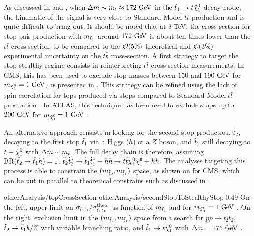     As discussed in  and
    , when $\Delta m \sim m_{t} \approx
    172~\text{GeV}$ in the $\tilde{t}_1 \rightarrow t \tilde{\chi}_1^0$ decay mode, the
    kinematic of the signal is very close to Standard Model $t\bar{t}$
    production and is quite difficult to bring out. It should be noted that at 8
    TeV, the cross-section for stop pair production with $m_{\tilde{t}_1}$ around
    $172~\text{GeV}$ is about ten times lower than the $t\bar{t}$ cross-section, to be
    compared to the $\mathcal{O}(5\%)$ theoretical and $\mathcal{O}(3\%)$ experimental
    uncertainty on the $t\bar{t}$ cross-section. A first strategy to target the
    stop stealthy regime consists in reinterpreting $t\bar{t}$ cross-section
    measurements. In CMS, this has been used to exclude stop masses between
    $150$ and $190~\text{GeV}$ for $m_{\tilde{\chi}_1^0} = 1~\text{GeV}$, as presented in
     \cite{topCrossSectionMeasurement}. This strategy
    can be refined using the lack of spin correlation for tops produced via
    stops compared to Standard Model $t\bar{t}$ production
    \cite{LightStopSigns}.  In ATLAS, this technique has been used to exclude
    stops up to $200~\text{GeV}$ for $m_{\tilde{\chi}_1^0} = 1~\text{GeV}$
    \cite{ATLASstealthyStops}.

    An alternative approach consists in looking for the second stop production,
    $\tilde{t}_2$, decaying to the first stop $\tilde{t}_1$ via a Higgs ($h$) or a
    $Z$ boson, and $\tilde{t}_1$ still decaying to $t + \tilde{\chi}_1^0$ with $\Delta m
    \sim m_{t}$. The full decay chain is therefore, assuming
    $\text{BR}(\tilde{t}_2 \rightarrow \tilde{t}_1 h) = 1$, $\tilde{t}_2
    \tilde{t}^*_2 \rightarrow \tilde{t}_1 \tilde{t}_1^* + hh \rightarrow t\bar{t}
    \tilde{\chi}_1^0 \tilde{\chi}_1^0 + hh$.  The analyses \cite{SUS-13-024,
    ATLASstopSearches} targeting this process is able to constrain the
    $(m_{\tilde{t}_2},m_{\tilde{t}_1})$ space, as shown on
     for CMS, which can be put in parallel to
    theoretical constrains such as discussed in
    .

                     {otherAnalysis/topCrossSection}
                     {otherAnalysis/secondStopToStealthyStop}
                     {0.49}
                     { On the left, upper limit on $\sigma_{\tilde{t}_1\tilde{t}_1} /
                     \sigma^\text{theo.}_{\tilde{t}_1\tilde{t}_1}$ as function of
                     $m_{\tilde{t}_1}$ and for $m_{\tilde{\chi}_1^0} = 1~\text{GeV}$
                     \cite{topCrossSectionMeasurement}. On the right, exclusion
                     limit in the $(m_{\tilde{t}_2},m_{\tilde{t}_1})$ space
                     from a search for $pp \rightarrow \tilde{t}_2\tilde{t}_2$,
                     $\tilde{t}_2 \rightarrow \tilde{t}_1 h/Z$ with variable
                     branching ratio, and $\tilde{t}_1 \rightarrow t \tilde{\chi}_1^0$
                     with $\Delta m = 175~\text{GeV}$ \cite{SUS-13-024}.}

